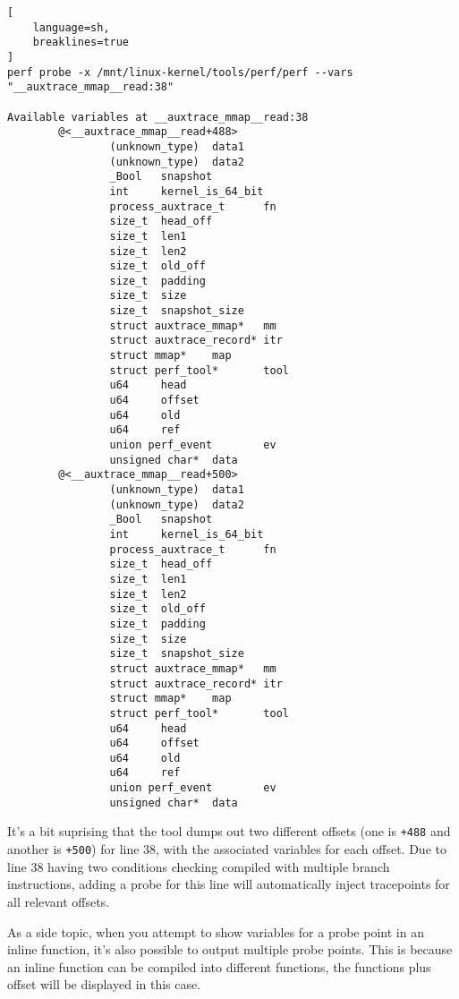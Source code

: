 \documentclass[11pt]{diazessay} %
\def\code#1{\texttt{#1}}
\begin{document}
\begin{lstlisting}[
  	language=sh,
	breaklines=true
]
perf probe -x /mnt/linux-kernel/tools/perf/perf --vars "__auxtrace_mmap__read:38"

Available variables at __auxtrace_mmap__read:38
        @<__auxtrace_mmap__read+488>
                (unknown_type)  data1
                (unknown_type)  data2
                _Bool   snapshot
                int     kernel_is_64_bit
                process_auxtrace_t      fn
                size_t  head_off
                size_t  len1
                size_t  len2
                size_t  old_off
                size_t  padding
                size_t  size
                size_t  snapshot_size
                struct auxtrace_mmap*   mm
                struct auxtrace_record* itr
                struct mmap*    map
                struct perf_tool*       tool
                u64     head
                u64     offset
                u64     old
                u64     ref
                union perf_event        ev
                unsigned char*  data
        @<__auxtrace_mmap__read+500>
                (unknown_type)  data1
                (unknown_type)  data2
                _Bool   snapshot
                int     kernel_is_64_bit
                process_auxtrace_t      fn
                size_t  head_off
                size_t  len1
                size_t  len2
                size_t  old_off
                size_t  padding
                size_t  size
                size_t  snapshot_size
                struct auxtrace_mmap*   mm
                struct auxtrace_record* itr
                struct mmap*    map
                struct perf_tool*       tool
                u64     head
                u64     offset
                u64     old
                u64     ref
                union perf_event        ev
                unsigned char*  data
\end{lstlisting}

It's a bit suprising that the tool dumps out two different offsets (one is
\code{+488} and another is \code{+500}) for line 38, with the associated
variables for each offset. Due to line 38 having two conditions checking
compiled with multiple branch instructions, adding a probe for this line will
automatically inject tracepoints for all relevant offsets.

As a side topic, when you attempt to show variables for a probe point in an
inline function, it's also possible to output multiple probe points. This is
because an inline function can be compiled into different functions, the
functions plus offset will be displayed in this case.
\end{document}
